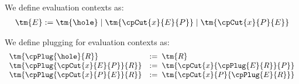 \begin{definition}\label{def:cp-evaluation-contexts}
  We define evaluation contexts as:
  \begin{gather*}
    \tm{E} := \tm{\hole} \mid \tm{\cpCut{x}{E}{P}} \mid \tm{\cpCut{x}{P}{E}}
  \end{gather*}
\end{definition}
\begin{definition}[Plugging]\label{def:cp-evaluation-context-plugging}
  We define plugging for evaluation contexts as:
  \begin{gather*}
    \begin{array}{ll}
      \tm{\cpPlug{\hole}{R}}            
      & := \; \tm{R}
      \\
      \tm{\cpPlug{\cpCut{x}{E}{P}}{R}}
      & := \; \tm{\cpCut{x}{\cpPlug{E}{R}}{P}}
      \\
      \tm{\cpPlug{\cpCut{x}{P}{E}}{R}}
      & := \; \tm{\cpCut{x}{P}{\cpPlug{E}{R}}}
    \end{array}
  \end{gather*}
\end{definition}
